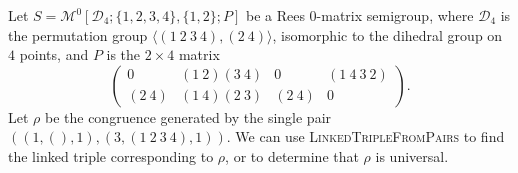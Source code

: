 \begin{example}
  \label{ex:pairs-to-linked-triple-4x2}
  Let $S = \mathcal{M}^0[\mathcal{D}_4; \{1,2,3,4\}, \{1,2\}; P]$ be a Rees
  0-matrix semigroup, where $\mathcal{D}_4$ is the permutation group
  $\langle (1~2~3~4), (2~4) \rangle$, isomorphic to the dihedral group on $4$
  points, and $P$ is the $2 \times 4$ matrix
  $$
  \begin{pmatrix}
    0 & (1~2)(3~4) & 0 & (1~4~3~2) \\
    (2~4) & (1~4)(2~3) & (2~4) & 0
  \end{pmatrix}.
  $$
  Let $\rho$ be the congruence generated by the single pair
  $\left(\left(1, (), 1\right), \left(3, (1~2~3~4), 1\right)\right)$.  We can
  use \textsc{LinkedTripleFromPairs} to find the linked triple corresponding to
  $\rho$, or to determine that $\rho$ is universal.


\end{example}
